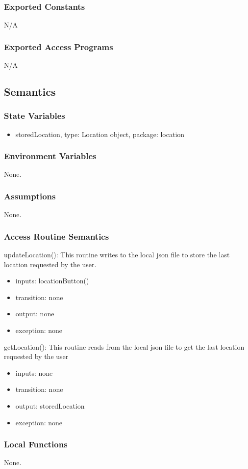 \subsubsection{Exported Constants}

N/A

\subsubsection{Exported Access Programs}

N/A

\subsection{Semantics}

\subsubsection{State Variables}

\begin{itemize}
\item storedLocation, type: Location object, package: location
\end{itemize}


\subsubsection{Environment Variables}

None.


\subsubsection{Assumptions}

None.

\subsubsection{Access Routine Semantics}

\noindent updateLocation():
This routine writes to the local json file to store the last location requested by the user.
\begin{itemize}
\item inputs: locationButton()
\item transition: none
\item output: none
\item exception: none
\end{itemize}

\noindent getLocation():
This routine reads from the local json file to get the last location requested by the user
\begin{itemize}
\item inputs: none
\item transition: none
\item output: storedLocation
\item exception: none
\end{itemize}

\subsubsection{Local Functions}

None.

